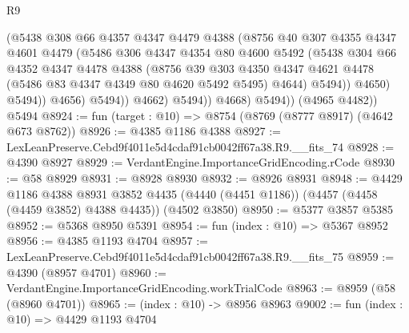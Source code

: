 \begin{lexlean}{R9}
\begin{coremodule}
                          (@5438
                            @308
                            @66
                            @4357
                            @4347
                            @4479
                            @4388
                            (@8756
                              @40
                              @307
                              @4355
                              @4347
                              @4601
                              @4479
                              (@5486
                                @306
                                @4347
                                @4354
                                @80
                                @4600
                                @5492
                                (@5438
                                  @304
                                  @66
                                  @4352
                                  @4347
                                  @4478
                                  @4388
                                  (@8756
                                    @39
                                    @303
                                    @4350
                                    @4347
                                    @4621
                                    @4478
                                    (@5486 @83 @4347 @4349 @80 @4620 @5492 @5495)
                                    @4644)
                                  @5494))
                              @4650)
                            @5494))
                        @4656)
                      @5494))
                  @4662)
                @5494))
            @4668)
          @5494))
      (@4965 @4482))
    @5494
@8924 := fun (target : @10) => @8754 (@8769 (@8777 @8917) (@4642 @673 @8762))
@8926 := @4385 @1186 @4388
@8927 := LexLeanPreserve.Cebd9f4011e5d4cdaf91cb0042ff67a38.R9.__fits_74
@8928 := @4390 @8927
@8929 := VerdantEngine.ImportanceGridEncoding.rCode
@8930 := @58 @8929
@8931 := @8928 @8930
@8932 := @8926 @8931
@8948 := @4429
    @1186
    @4388
    @8931
    @3852
    @4435
    (@4440 (@4451 @1186))
    (@4457 (@4458 (@4459 @3852) @4388 @4435))
    (@4502 @3850)
@8950 := @5377 @3857 @5385
@8952 := @5368 @8950 @5391
@8954 := fun (index : @10) => @5367 @8952
@8956 := @4385 @1193 @4704
@8957 := LexLeanPreserve.Cebd9f4011e5d4cdaf91cb0042ff67a38.R9.__fits_75
@8959 := @4390 (@8957 @4701)
@8960 := VerdantEngine.ImportanceGridEncoding.workTrialCode
@8963 := @8959 (@58 (@8960 @4701))
@8965 := (index : @10) -> @8956 @8963
@9002 := fun (index : @10) =>
  @4429
    @1193
    @4704

\end{coremodule}
\end{lexlean}
